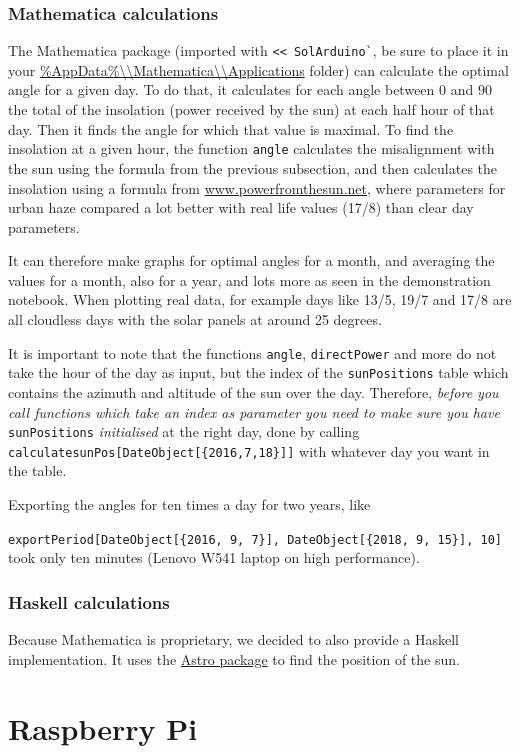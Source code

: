 \documentclass{article}
\begin{document}
    \subsubsection{Mathematica calculations}\label{subsec:mathematicaCalculations}

    The Mathematica package (imported with \verb|<< SolArduino`|, be sure to place it in your
    \url{\%AppData\%\\Mathematica\\Applications} folder) can calculate the optimal angle for a given day.
    To do that, it calculates for each angle between $0$ and $90$ the total of the insolation (power received by the sun) at each half hour of that day.
    Then it finds the angle for which that value is maximal.
    To find the insolation at a given hour, the function \verb|angle| calculates the misalignment with the sun using the formula from the previous subsection, and then calculates the insolation using a formula from \href{http://www.powerfromthesun.net/Book/chapter02/chapter02.html#ZEqnNum929295 }{www.powerfromthesun.net}, where parameters for urban haze compared a lot better with real life values (17/8) than clear day parameters.

    It can therefore make graphs for optimal angles for a month, and averaging the values for a month, also for a year, and lots more as seen in the demonstration notebook.
    When plotting real data, for example days like 13/5, 19/7 and 17/8 are all cloudless days with the solar panels at around 25 degrees.

    It is important to note that the functions \verb|angle|, \verb|directPower| and more do not take the hour of the day as input, but the index of the \verb|sunPositions| table which contains the azimuth and altitude of the sun over the day.
    Therefore, \textit{before you call functions which take an index as parameter you need to make sure you have }\verb|sunPositions| \textit{initialised} at the right day, done by calling \verb|calculatesunPos[DateObject[{2016,7,18}]]| with whatever day you want in the table.

    Exporting the angles for ten times a day for two years, like

    \verb|exportPeriod[DateObject[{2016, 9, 7}], DateObject[{2018, 9, 15}], 10]| took only ten minutes (Lenovo W541 laptop on high performance).

    \subsubsection{Haskell calculations}

    Because Mathematica is proprietary, we decided to also provide a Haskell implementation.
    It uses the \href{https://hackage.haskell.org/package/astro}{Astro package} to find the position of the sun.


    \section{Raspberry Pi}\label{ch:pi}
    
\end{document}
